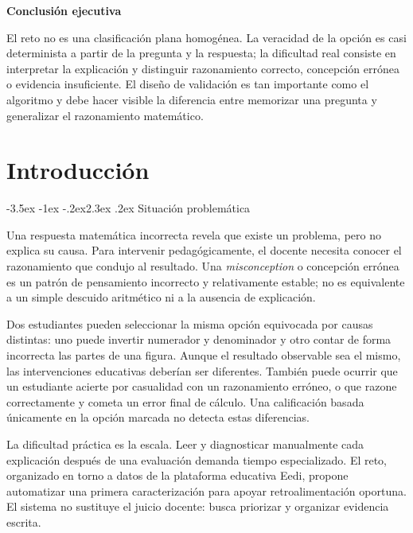 \documentclass[11pt,oneside,openany]{book}
\makeatletter
\renewcommand\section{\@startsection{section}{1}{\z@}%
  {-3.5ex \@plus -1ex \@minus -.2ex}{2.3ex \@plus .2ex}%
  {\normalfont\Large\sffamily\bfseries\color{AzulMedio}}}
\newenvironment{decision}[1][]{%
  \begin{lrbox}{\infobox}\begin{minipage}{0.92\textwidth}
  \color{GrisTexto}\sffamily\textbf{#1}\par\smallskip\rmfamily}
  {\end{minipage}\end{lrbox}\par\medskip\noindent
   \colorbox{VerdeClaro}{\usebox{\infobox}}\par\medskip}
\makeatother
\begin{document}
\begin{decision}[Conclusión ejecutiva]
El reto no es una clasificación plana homogénea. La veracidad de la opción es
casi determinista a partir de la pregunta y la respuesta; la dificultad real
consiste en interpretar la explicación y distinguir razonamiento correcto,
concepción errónea o evidencia insuficiente. El diseño de validación es tan
importante como el algoritmo y debe hacer visible la diferencia entre memorizar
una pregunta y generalizar el razonamiento matemático.
\end{decision}

\tableofcontents
\listoffigures
\listoftables

\mainmatter

\chapter{Introducción}

\section{Situación problemática}

Una respuesta matemática incorrecta revela que existe un problema, pero no
explica su causa. Para intervenir pedagógicamente, el docente necesita conocer
el razonamiento que condujo al resultado. Una \emph{misconception} o concepción
errónea es un patrón de pensamiento incorrecto y relativamente estable; no es
equivalente a un simple descuido aritmético ni a la ausencia de explicación.

Dos estudiantes pueden seleccionar la misma opción equivocada por causas
distintas: uno puede invertir numerador y denominador y otro contar de forma
incorrecta las partes de una figura. Aunque el resultado observable sea el
mismo, las intervenciones educativas deberían ser diferentes. También puede
ocurrir que un estudiante acierte por casualidad con un razonamiento erróneo, o
que razone correctamente y cometa un error final de cálculo. Una calificación
basada únicamente en la opción marcada no detecta estas diferencias.

La dificultad práctica es la escala. Leer y diagnosticar manualmente cada
explicación después de una evaluación demanda tiempo especializado. El reto,
organizado en torno a datos de la plataforma educativa Eedi, propone automatizar
una primera caracterización para apoyar retroalimentación oportuna. El sistema
no sustituye el juicio docente: busca priorizar y organizar evidencia escrita.
\end{document}
